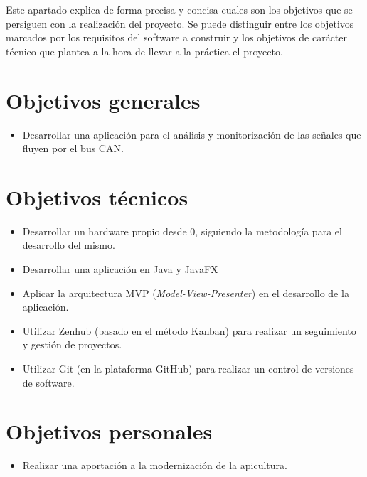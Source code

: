 
Este apartado explica de forma precisa y concisa cuales son los objetivos que se persiguen con la realización del proyecto. Se puede distinguir entre los objetivos marcados por los requisitos del software a construir y los objetivos de carácter técnico que plantea a la hora de llevar a la práctica el proyecto.



\section{Objetivos generales}\label{objetivos-generales}

\begin{itemize}
\tightlist
\item
  Desarrollar una aplicación para el análisis y monitorización de las señales que fluyen por el bus CAN.
  
\end{itemize}

\section{Objetivos técnicos}\label{objetivos-tecnicos}

\begin{itemize}
\tightlist
\item
  Desarrollar un hardware propio desde 0, siguiendo la metodología para el desarrollo del mismo.
\item
  Desarrollar una aplicación en Java y JavaFX 
\item
  Aplicar la arquitectura MVP (\emph{Model-View-Presenter}) en el
  desarrollo de la aplicación.
\item
  Utilizar Zenhub (basado en el método Kanban) para realizar un seguimiento y gestión de proyectos.
\item
  Utilizar Git (en la plataforma GitHub) para realizar un control de versiones de software.
\end{itemize}

\section{Objetivos personales}\label{objetivos-personales}

\begin{itemize}
\tightlist
\item
  Realizar una aportación a la modernización de la apicultura.

\end{itemize}